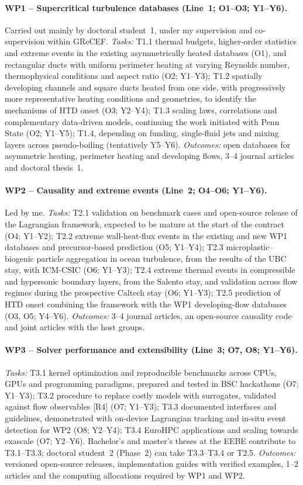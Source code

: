 \documentclass[11pt]{article}
\begin{document}
\paragraph{WP1 -- Supercritical turbulence databases (Line~1; O1--O3; Y1--Y6).} Carried out
mainly by doctoral student~1, under my supervision and co-supervision within GReCEF.
\emph{Tasks:} T1.1 thermal budgets, higher-order statistics and extreme events in the existing
asymmetrically heated databases (O1), and rectangular ducts with uniform perimeter heating at
varying Reynolds number, thermophysical conditions and aspect ratio (O2; Y1--Y3); T1.2 spatially
developing channels and square ducts heated from one side, with progressively more representative
heating conditions and geometries, to identify the mechanisms of HTD onset (O3; Y2--Y4); T1.3
scaling laws, correlations and complementary data-driven models, continuing the work initiated
with Penn State (O2; Y1--Y5); T1.4, depending on funding, single-fluid jets and mixing layers
across pseudo-boiling (tentatively Y5--Y6).
\emph{Outcomes:} open databases for asymmetric heating, perimeter heating and developing flows,
3--4 journal articles and doctoral thesis~1.

\paragraph{WP2 -- Causality and extreme events (Line~2; O4--O6; Y1--Y6).} Led by me.
\emph{Tasks:} T2.1 validation on benchmark cases and open-source release of the Lagrangian
framework, expected to be mature at the start of the contract (O4; Y1--Y2); T2.2 extreme
wall-heat-flux events in the existing and new WP1 databases and precursor-based prediction (O5;
Y1--Y4); T2.3 microplastic--biogenic particle aggregation in ocean turbulence, from the results
of the UBC stay, with ICM-CSIC (O6; Y1--Y3); T2.4 extreme thermal events in compressible and
hypersonic boundary layers, from the Salento stay, and validation across flow regimes during the
prospective Caltech stay (O6; Y1--Y3); T2.5 prediction of HTD onset combining the
framework with the WP1 developing-flow databases (O3, O5; Y4--Y6).
\emph{Outcomes:} 3--4 journal articles, an open-source causality code and joint articles with
the host groups.

\paragraph{WP3 -- Solver performance and extensibility (Line~3; O7, O8; Y1--Y6).}
\emph{Tasks:} T3.1 kernel optimization and reproducible benchmarks across CPUs, GPUs and
programming paradigms, prepared and tested in BSC hackathons (O7; Y1--Y3); T3.2 procedure to
replace costly models with surrogates, validated against flow observables [R4] (O7; Y1--Y3);
T3.3 documented interfaces and guidelines, demonstrated with on-device Lagrangian tracking and
in-situ event detection for WP2 (O8; Y2--Y4); T3.4 EuroHPC applications and scaling towards
exascale (O7; Y2--Y6). Bachelor's and master's theses at the EEBE contribute to T3.1--T3.3;
doctoral student~2 (Phase~2) can take T3.3--T3.4 or T2.5.
\emph{Outcomes:} versioned open-source releases, implementation guides with verified examples,
1--2 articles and the computing allocations required by WP1 and WP2.
\end{document}

